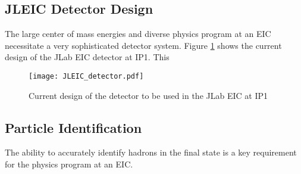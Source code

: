\subsection{JLEIC Detector Design}
The large center of mass energies and diverse physics program at an EIC necessitate a very sophisticated detector system. Figure \ref{fig:jleic_detector} shows the current design of the JLab EIC detector at IP1. This 

\begin{figure}
	\centering
	\texttt{[image: JLEIC\_detector.pdf]}
	\caption{Current design of the detector to be used in the JLab EIC at IP1}
	\label{fig:jleic_detector}
\end{figure}

\subsection{Particle Identification}
The ability to accurately identify hadrons in the final state is a key requirement for the physics program at an EIC.